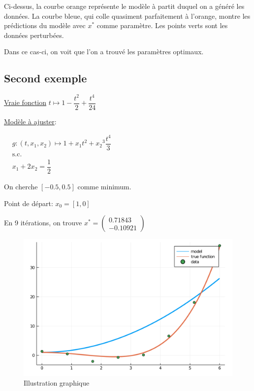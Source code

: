 \documentclass[a4paper,11pt]{article}
\numberwithin{equation}{section}
\begin{document}
Ci-dessus, la courbe orange représente le modèle à partit duquel on a généré les données. La courbe bleue, qui colle quasiment parfaitement à l'orange, montre les prédictions du modèle avec $x^{*}$ comme paramètre. Les points verts sont les données perturbées. 

Dans ce cas-ci, on voit que l'on a trouvé les paramètres optimaux.
\newpage
\subsection{Second exemple}

\underline{Vraie fonction} $t\mapsto 1 - \dfrac{t^2}{2} + \dfrac{t^4}{24}$
\newline

\underline{Modèle à ajuster}:

$
\begin{aligned}
&g:(t, x_1, x_2) \mapsto 1 + x_1t^2 + {x_2}^3\dfrac{t^4}{3}\\
&\text{s.c.}\\
&x_1 + 2x_2 = \dfrac{1}{2}
\end{aligned}
$

On cherche $[-0.5,0.5]$ comme minimum.


Point de départ:
$x_{0} = [1, 0]$

En 9 itérations, on trouve 
 $x^{*} = \begin{pmatrix}
0.71843\\
-0.10921
\end{pmatrix}$

\begin{figure}[!h]
\centering
\includegraphics[scale=0.6]{images/courbe2}
\caption{Illustration graphique}
\end{figure}
\end{document}
